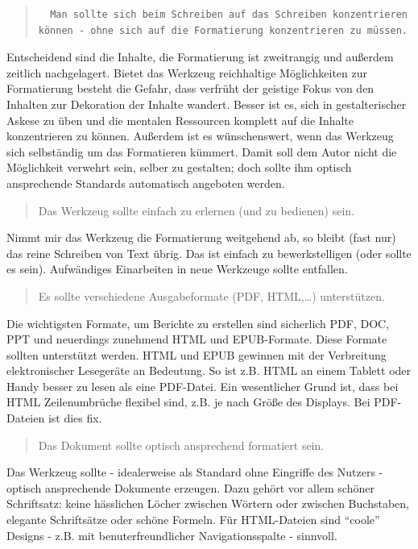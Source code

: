 \documentclass[12pt,]{book}
\begin{document}
\begin{quote}
\begin{verbatim}
  Man sollte sich beim Schreiben auf das Schreiben konzentrieren können - ohne sich auf die Formatierung konzentrieren zu müssen.
\end{verbatim}
\end{quote}

Entscheidend sind die Inhalte, die Formatierung ist zweitrangig und
außerdem zeitlich nachgelagert. Bietet das Werkzeug reichhaltige
Möglichkeiten zur Formatierung besteht die Gefahr, dass verfrüht der
geistige Fokus von den Inhalten zur Dekoration der Inhalte wandert.
Besser ist es, sich in gestalterischer Askese zu üben und die mentalen
Ressourcen komplett auf die Inhalte konzentrieren zu können. Außerdem
ist es wünschenswert, wenn das Werkzeug sich selbständig um das
Formatieren kümmert. Damit soll dem Autor nicht die Möglichkeit verwehrt
sein, selber zu gestalten; doch sollte ihm optisch ansprechende
Standards automatisch angeboten werden.

\begin{quote}
Das Werkzeug sollte einfach zu erlernen (und zu bedienen) sein.
\end{quote}

Nimmt mir das Werkzeug die Formatierung weitgehend ab, so bleibt (fast
nur) das reine Schreiben von Text übrig. Das ist einfach zu
bewerkstelligen (oder sollte es sein). Aufwändiges Einarbeiten in neue
Werkzeuge sollte entfallen.

\begin{quote}
Es sollte verschiedene Ausgabeformate (PDF, HTML,\ldots{}) unterstützen.
\end{quote}

Die wichtigsten Formate, um Berichte zu erstellen sind sicherlich PDF,
DOC, PPT und neuerdings zunehmend HTML und EPUB-Formate. Diese Formate
sollten unterstützt werden. HTML und EPUB gewinnen mit der Verbreitung
elektronischer Lesegeräte an Bedeutung. So ist z.B. HTML an einem
Tablett oder Handy besser zu lesen als eine PDF-Datei. Ein wesentlicher
Grund ist, dass bei HTML Zeilenumbrüche flexibel sind, z.B. je nach
Größe des Displays. Bei PDF-Dateien ist dies fix.

\begin{quote}
Das Dokument sollte optisch ansprechend formatiert sein.
\end{quote}

Das Werkzeug sollte - idealerweise als Standard ohne Eingriffe des
Nutzers - optisch ansprechende Dokumente erzeugen. Dazu gehört vor allem
schöner Schriftsatz: keine hässlichen Löcher zwischen Wörtern oder
zwischen Buchstaben, elegante Schriftsätze oder schöne Formeln. Für
HTML-Dateien sind ``coole'' Designs - z.B. mit benuterfreundlicher
Navigationsspalte - sinnvoll.
\end{document}
